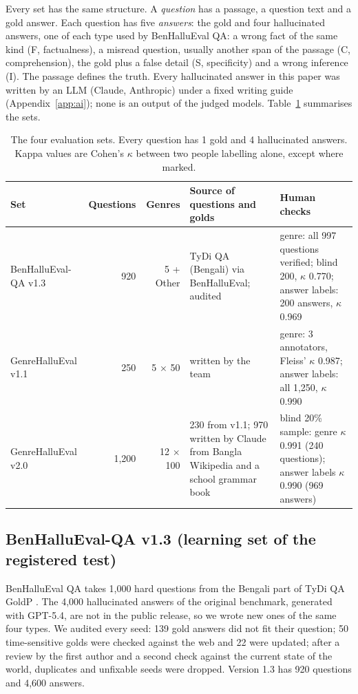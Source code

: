 \documentclass[pdflatex,sn-apa]{sn-jnl}
\begin{document}
Every set has the same structure. A \emph{question} has a passage, a question text and a gold answer. Each question
has five \emph{answers}: the gold and four hallucinated answers, one of each type used by BenHalluEval QA: a wrong fact
of the same kind (F, factualness), a misread question, usually another span of the passage (C, comprehension), the
gold plus a false detail (S, specificity) and a wrong inference (I). The passage defines the truth. Every hallucinated
answer in this paper was written by an LLM (Claude, Anthropic) under a fixed writing guide (Appendix~\ref{app:ai});
none is an output of the judged models. Table~\ref{tab:data} summarises the sets.

\begin{table}[t]
\centering\small
\caption{The four evaluation sets. Every question has 1 gold and 4 hallucinated answers. Kappa values are Cohen's
$\kappa$ between two people labelling alone, except where marked.}\label{tab:data}
\begin{tabularx}{\textwidth}{@{}l r r X X@{}}
\toprule
Set & Questions & Genres & Source of questions and golds & Human checks \\
\midrule
BenHalluEval-QA v1.3 & 920 & 5 + Other & TyDi QA (Bengali) via BenHalluEval; audited & genre: all 997 questions verified; blind 200, $\kappa$ 0.770; answer labels: 200 answers, $\kappa$ 0.969 \\
GenreHalluEval v1.1 & 250 & 5 $\times$ 50 & written by the team & genre: 3 annotators, Fleiss' $\kappa$ 0.987; answer labels: all 1,250, $\kappa$ 0.990 \\
GenreHalluEval v2.0 & 1,200 & 12 $\times$ 100 & 230 from v1.1; 970 written by Claude from Bangla Wikipedia and a school grammar book & blind 20\% sample: genre $\kappa$ 0.991 (240 questions); answer labels $\kappa$ 0.990 (969 answers) \\
\bottomrule
\end{tabularx}
\end{table}

\subsection{BenHalluEval-QA v1.3 (learning set of the registered test)}

BenHalluEval QA takes 1,000 hard questions from the Bengali part of TyDi QA GoldP \citep{benhallueval,clark2020tydi}.
The 4,000 hallucinated answers of the original benchmark, generated with GPT-5.4, are not in the public release, so we
wrote new ones of the same four types. We audited every seed: 139 gold answers did not fit their question; 50
time-sensitive golds were checked against the web and 22 were updated; after a review by the first author and a
second check against the current state of the world, duplicates and unfixable seeds were dropped. Version 1.3 has 920
questions and 4,600 answers.
\end{document}
